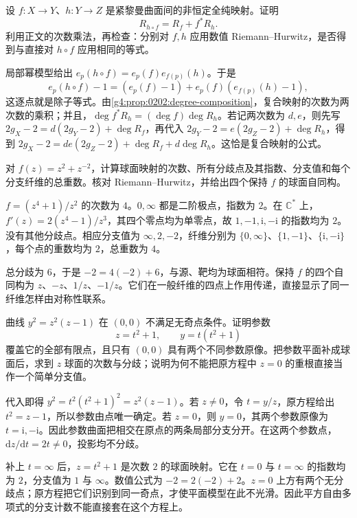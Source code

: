\begin{exercise}
	\label{g4:ex:0201:composite-ramification}
	设 \(f:X\to Y\)、\(h:Y\to Z\) 是紧黎曼曲面间的非恒定全纯映射。证明
	\[
		R_{h\circ f}=R_f+f^*R_h.
	\]
	利用正文的次数乘法，再检查：分别对 \(f,h\) 应用数值 Riemann--Hurwitz，是否得到与直接对 \(h\circ f\) 应用相同的等式。
\end{exercise}
\begin{solution}
	局部幂模型给出 \(e_p(h\circ f)=e_p(f)e_{f(p)}(h)\)。于是
	\[
		e_p(h\circ f)-1=(e_p(f)-1)+e_p(f)(e_{f(p)}(h)-1),
	\]
	这逐点就是除子等式。由\cref{g4:prop:0202:degree-composition}，复合映射的次数为两次数的乘积；并且，\(\deg f^*R_h=(\deg f)\deg R_h\)。若记两次数为 \(d,e\)，则先写 \(2g_X-2=d(2g_Y-2)+\deg R_f\)，再代入 \(2g_Y-2=e(2g_Z-2)+\deg R_h\)，得到 \(2g_X-2=de(2g_Z-2)+\deg R_f+d\deg R_h\)。这恰是复合映射的公式。
\end{solution}

\begin{exercise}
	\label{g4:ex:0201:four-sheet-map}
	对 \(f(z)=z^2+z^{-2}\)，计算球面映射的次数、所有分歧点及其指数、分支值和每个分支纤维的总重数。核对 Riemann--Hurwitz，并给出四个保持 \(f\) 的球面自同构。
\end{exercise}
\begin{solution}
	\(f=(z^4+1)/z^2\) 的次数为 \(4\)。\(0,\infty\) 都是二阶极点，指数为 \(2\)。在 \(\mathbb C^*\) 上，\(f'(z)=2(z^4-1)/z^3\)，其四个零点均为单零点，故 \(1,-1,\mathrm{i},-\mathrm{i}\) 的指数均为 \(2\)。没有其他分歧点。相应分支值为 \(\infty,2,-2\)，纤维分别为 \(\{0,\infty\}\)、\(\{1,-1\}\)、\(\{\mathrm{i},-\mathrm{i}\}\)，每个点的重数均为 \(2\)，总重数为 \(4\)。

	总分歧为 \(6\)，于是 \(-2=4(-2)+6\)，与源、靶均为球面相符。保持 \(f\) 的四个自同构为 \(z\)、\(-z\)、\(1/z\)、\(-1/z\)。它们在一般纤维的四点上作用传递，直接显示了同一纤维怎样由对称性联系。
\end{solution}

\begin{exercise}
	\label{g4:ex:0201:singular-double-point}
	曲线 \(y^2=z^2(z-1)\) 在 \((0,0)\) 不满足无奇点条件。证明参数
	\[
		z=t^2+1,\qquad y=t(t^2+1)
	\]
	覆盖它的全部有限点，且只有 \((0,0)\) 具有两个不同参数原像。把参数平面补成球面后，求到 \(z\) 球面的次数与分歧；说明为何不能把原方程中 \(z=0\) 的重根直接当作一个简单分支值。
\end{exercise}
\begin{solution}
	代入即得 \(y^2=t^2(t^2+1)^2=z^2(z-1)\)。若 \(z\ne0\)，令 \(t=y/z\)，原方程给出 \(t^2=z-1\)，所以参数由点唯一确定。若 \(z=0\)，则 \(y=0\)，其两个参数原像为 \(t=\mathrm{i},-\mathrm{i}\)。因此参数曲面把相交在原点的两条局部分支分开。在这两个参数点，\(\mathrm{d}z/\mathrm{d}t=2t\ne0\)，投影均不分歧。

	补上 \(t=\infty\) 后，\(z=t^2+1\) 是次数 \(2\) 的球面映射。它在 \(t=0\) 与 \(t=\infty\) 的指数均为 \(2\)，分支值为 \(1\) 与 \(\infty\)。数值公式为 \(-2=2(-2)+2\)。\(z=0\) 上方有两个无分歧点；原方程把它们识别到同一奇点，才使平面模型在此不光滑。因此平方自由多项式的分支计数不能直接套在这个方程上。
\end{solution}


